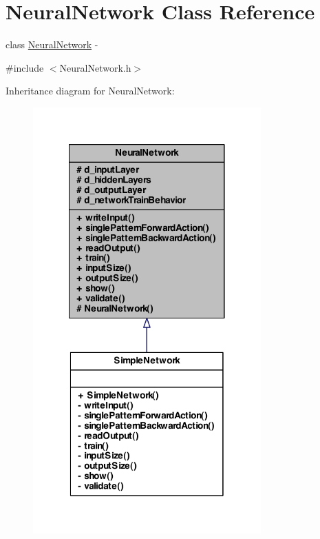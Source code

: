 \hypertarget{class_neural_network}{
\section{NeuralNetwork Class Reference}
\label{class_neural_network}
}


class \hyperlink{class_neural_network}{NeuralNetwork} -\/  




{\ttfamily \#include $<$NeuralNetwork.h$>$}



Inheritance diagram for NeuralNetwork:\nopagebreak
\begin{figure}[H]
\begin{center}
\leavevmode
\includegraphics[width=248pt]{class_neural_network__inherit__graph}
\end{center}
\end{figure}
